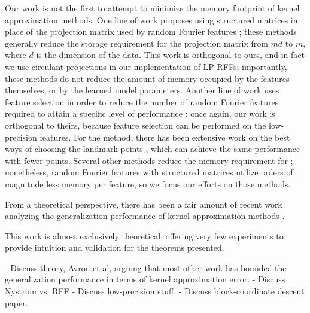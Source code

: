 Our work is not the first to attempt to minimize the memory footprint of kernel approximation methods.  One line of work proposes using structured matrices in place of the projection matrix used by random Fourier features \citep{fastfood,yu15,sphereRKS}; these methods generally reduce the storage requirement for the projection matrix from $md$ to $m$, where $d$ is the dimension of the data. This work is orthogonal to ours, and in fact we use circulant projections \citep{yu15} in our implementation of LP-RFFs; importantly, these methods do not reduce the amount of memory occupied by the features themselves, or by the learned model parameters. Another line of work uses feature selection in order to reduce the number of random Fourier features required to attain a specific level of performance \citep{sparseRKS, may2016}; once again, our work is orthogonal to theirs, because feature selection can be performed on the low-precision features.  For the \Nystrom method, there has been extensive work on the best ways of choosing the landmark points \citep{kmeans08,kumar12,gittens13}, which can achieve the same performance with fewer points.  Several other methods reduce the memory requirement for \Nystrom \cite{ensemble09,fastpred14,meka14}; nonetheless, random Fourier features with structured matrices utilize orders of magnitude less memory per feature, so we focus our efforts on those methods.

From a theoretical perspective, there has been a fair amount of recent work analyzing the generalization performance of kernel approximation methods \citep{bach13,alaoui15,rudi15,optrff15,musco17,rudi17,bach17,avron17}. 


This work is almost exclusively theoretical, offering very few experiments to provide intuition and validation for the theorems presented.


- Discuss theory, Avron et al, arguing that most other work has bounded the generalization performance in terms of kernel approximation error.
- Discuss Nystrom vs. RFF
- Discuss low-precision stuff.
- Discuss block-coordinate descent paper.



